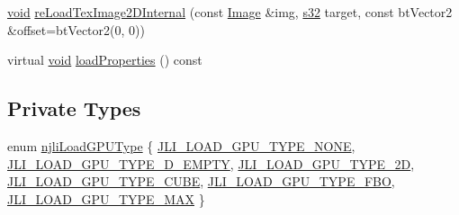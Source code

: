 \begin{DoxyCompactItemize}
\item 
\mbox{\hyperlink{_thread_8h_af1e856da2e658414cb2456cb6f7ebc66}{void}} \mbox{\hyperlink{classnjli_1_1_material_property_ad04b3469ee0c493240c55e1294c71727}{re\+Load\+Tex\+Image2\+D\+Internal}} (const \mbox{\hyperlink{classnjli_1_1_image}{Image}} \&img, \mbox{\hyperlink{_util_8h_aa62c75d314a0d1f37f79c4b73b2292e2}{s32}} target, const bt\+Vector2 \&offset=bt\+Vector2(0, 0))
\item 
virtual \mbox{\hyperlink{_thread_8h_af1e856da2e658414cb2456cb6f7ebc66}{void}} \mbox{\hyperlink{classnjli_1_1_material_property_ae72cdc356494add65927cabbb9141d82}{load\+Properties}} () const
\end{DoxyCompactItemize}
\subsection*{Private Types}
\begin{DoxyCompactItemize}
\item 
enum \mbox{\hyperlink{classnjli_1_1_material_property_ae02b26fdb8ff7968cc6def931e69855b}{njli\+Load\+G\+P\+U\+Type}} \{ \newline
\mbox{\hyperlink{classnjli_1_1_material_property_ae02b26fdb8ff7968cc6def931e69855bab2312f8edb2846647ff841d4a7813c89}{J\+L\+I\+\_\+\+L\+O\+A\+D\+\_\+\+G\+P\+U\+\_\+\+T\+Y\+P\+E\+\_\+\+N\+O\+NE}}, 
\mbox{\hyperlink{classnjli_1_1_material_property_ae02b26fdb8ff7968cc6def931e69855ba19facd571e661394fd10c4adc26e2de6}{J\+L\+I\+\_\+\+L\+O\+A\+D\+\_\+\+G\+P\+U\+\_\+\+T\+Y\+P\+E\+\_\+D\+\_\+\+E\+M\+P\+TY}}, 
\mbox{\hyperlink{classnjli_1_1_material_property_ae02b26fdb8ff7968cc6def931e69855ba84cee2de1a9c1bff7902327c2871a4cf}{J\+L\+I\+\_\+\+L\+O\+A\+D\+\_\+\+G\+P\+U\+\_\+\+T\+Y\+P\+E\+\_\+2D}}, 
\mbox{\hyperlink{classnjli_1_1_material_property_ae02b26fdb8ff7968cc6def931e69855ba705566d6faa4dc00bf60956035329286}{J\+L\+I\+\_\+\+L\+O\+A\+D\+\_\+\+G\+P\+U\+\_\+\+T\+Y\+P\+E\+\_\+\+C\+U\+BE}}, 
\newline
\mbox{\hyperlink{classnjli_1_1_material_property_ae02b26fdb8ff7968cc6def931e69855bac5507e15f557a30a23a193db80d35b57}{J\+L\+I\+\_\+\+L\+O\+A\+D\+\_\+\+G\+P\+U\+\_\+\+T\+Y\+P\+E\+\_\+\+F\+BO}}, 
\mbox{\hyperlink{classnjli_1_1_material_property_ae02b26fdb8ff7968cc6def931e69855bab57e4f81335fbb5b1af57ef0dde78a59}{J\+L\+I\+\_\+\+L\+O\+A\+D\+\_\+\+G\+P\+U\+\_\+\+T\+Y\+P\+E\+\_\+\+M\+AX}}
 \}
\end{DoxyCompactItemize}
